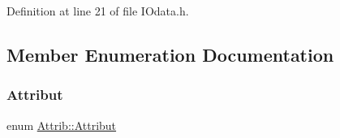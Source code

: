 Definition at line 21 of file I\+Odata.\+h.



\subsection{Member Enumeration Documentation}
\mbox{\label{classAttrib_a69e171d7cc6417835a5a306d3c764235}} 
\subsubsection{\texorpdfstring{Attribut}{Attribut}}
{\footnotesize\ttfamily enum \hyperlink{classAttrib_a69e171d7cc6417835a5a306d3c764235}{Attrib\+::\+Attribut}\hspace{0.3cm}{\ttfamily [inherited]}}

